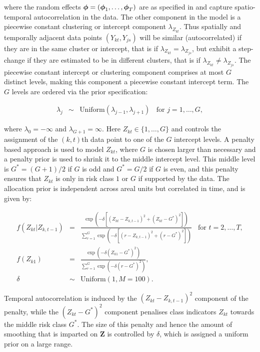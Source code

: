 \documentclass[article,shortnames,nojss]{jss}
\newcommand{\bd}[1]{\ensuremath{\mbox{\boldmath $#1$}}}
\begin{document}
where the random effects $\bd{\phi}=(\bd{\phi}_{1},\ldots,\bd{\phi}_{T})$ are as specified in  and capture spatio-temporal autocorrelation in the data. The other component in the model is a piecewise constant clustering or intercept component $\lambda_{Z_{kt}}$. Thus spatially and  temporally adjacent data points $(Y_{kt}, Y_{js})$ will be similar (autocorrelated) if they are in the same cluster or intercept, that is if $\lambda_{Z_{kt}}=\lambda_{Z_{js}}$, but exhibit a step-change if they are estimated to be in different clusters, that is if $\lambda_{Z_{kt}}\neq\lambda_{Z_{js}}$. The piecewise constant intercept or clustering component  comprises at most $G$ distinct levels, making this component a piecewise constant intercept term. The $G$ levels are ordered via the prior specification:

\begin{eqnarray}
\lambda_{j}&\sim&\mbox{Uniform}(\lambda_{j-1},\lambda_{j+1})~~~~\mbox{for }j=1,\dots,G,\label{carcluster2}
\end{eqnarray}

where $\lambda_{0}=-\infty$ and  $\lambda_{G+1}=\infty$. Here $Z_{kt}\in\{1,\ldots,G\}$ and controls the assignment of the $(k,t)$th data point to one of the $G$ intercept levels. A penalty based approach is used to model $Z_{kt}$, where $G$ is chosen larger than necessary and a penalty prior is used  to shrink it to the middle intercept level.  This middle level is $G^{*}=(G+1)/2$ if $G$ is odd and $G^{*}=G/2$ if $G$ is even, and this penalty ensures that $Z_{kt}$ is only in risk class $1$ or $G$ if supported by the data. The allocation prior is independent across areal units but correlated in time, and is given by:


\begin{eqnarray}
f(Z_{kt}|Z_{k,t-1})&=&\frac{\exp(-\delta[(Z_{kt}-Z_{k,t-1})^{2} +(Z_{kt}-G^{*})^{2}])}{\sum_{r=1}^{G}\exp(-\delta[(r-Z_{k,t-1})^{2}+(r-G^{*})^{2}])}~~~~\mbox{for } t=2,\ldots,T,\nonumber\\
f(Z_{k1})&=&\frac{\exp(-\delta(Z_{k1}-G^{*})^{2})}{\sum_{r=1}^{G}\exp(-\delta(r-G^{*})^{2})},\nonumber\\
\delta&\sim&\mbox{Uniform}(1,M=100).\label{carcluster3}
\end{eqnarray}

Temporal autocorrelation is induced by the $(Z_{kt}-Z_{k,t-1})^{2}$ component of the penalty, while the $(Z_{kt}-G^{*})^{2}$ component penalises class indicators $Z_{kt}$ towards the middle risk class $G^{*}$. The size of this penalty and hence the amount of smoothing that is imparted on $\mathbf{Z}$ is controlled by $\delta$, which is assigned a uniform prior on a large range.
\end{document}
